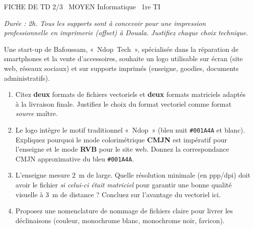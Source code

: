 \documentclass[11pt]{article}
\begin{document}
\begin{tcolorbox}[enhanced,colback=popink,colframe=popink,arc=10pt,boxrule=0pt,left=12pt,right=12pt,top=9pt,bottom=9pt]
{\color{white}\popxbold\small FICHE DE TD 2/3 \textbullet\ MOYEN \hfill Informatique \textbullet\ 1re TI\par}
\end{tcolorbox}
\vspace{4pt}
\emph{Durée : 2h. Tous les supports sont à concevoir pour une impression professionnelle en imprimerie (offset) à Douala. Justifiez chaque choix technique.}

\begin{exercice}
Une start-up de Bafoussam, « Ndop Tech », spécialisée dans la réparation de smartphones et la vente d'accessoires, souhaite un logo utilisable sur écran (site web, réseaux sociaux) et sur supports imprimés (enseigne, goodies, documents administratifs).
\begin{enumerate}
    \item Citez \textbf{deux} formats de fichiers vectoriels et \textbf{deux} formats matriciels adaptés à la livraison finale. Justifiez le choix du format vectoriel comme format \emph{source} maître.
    \item Le logo intègre le motif traditionnel « Ndop » (bleu nuit \texttt{\#001A4A} et blanc). Expliquez pourquoi le mode colorimétrique \textbf{CMJN} est impératif pour l'enseigne et le mode \textbf{RVB} pour le site web. Donnez la correspondance CMJN approximative du bleu \texttt{\#001A4A}.
    \item L'enseigne mesure \SI{2}{m} de large. Quelle résolution minimale (en ppp/dpi) doit avoir le fichier \emph{si celui-ci était matriciel} pour garantir une bonne qualité visuelle à \SI{3}{m} de distance ? Concluez sur l'avantage du vectoriel ici.
    \item Proposez une nomenclature de nommage de fichiers claire pour livrer les déclinaisons (couleur, monochrome blanc, monochrome noir, favicon).
\end{enumerate}
\end{exercice}
\end{document}
